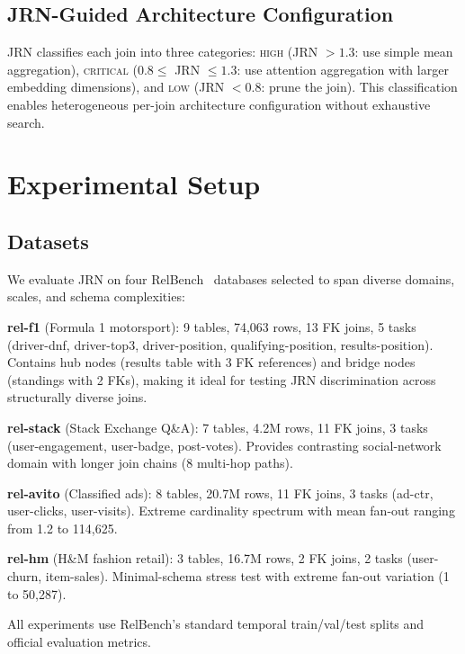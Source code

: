 \documentclass[11pt,letterpaper]{article}
\begin{document}
\subsection{JRN-Guided Architecture Configuration}

JRN classifies each join into three categories: \textsc{high} (JRN $> 1.3$: use simple mean aggregation), \textsc{critical} ($0.8 \leq$ JRN $\leq 1.3$: use attention aggregation with larger embedding dimensions), and \textsc{low} (JRN $< 0.8$: prune the join). This classification enables heterogeneous per-join architecture configuration without exhaustive search.

\section{Experimental Setup}
\label{sec:setup}

\subsection{Datasets}

We evaluate JRN on four RelBench~\citep{Robinson2024} databases selected to span diverse domains, scales, and schema complexities:

\textbf{rel-f1} (Formula 1 motorsport): 9 tables, 74,063 rows, 13 FK joins, 5 tasks (driver-dnf, driver-top3, driver-position, qualifying-position, results-position). Contains hub nodes (results table with 3 FK references) and bridge nodes (standings with 2 FKs), making it ideal for testing JRN discrimination across structurally diverse joins.

\textbf{rel-stack} (Stack Exchange Q\&A): 7 tables, 4.2M rows, 11 FK joins, 3 tasks (user-engagement, user-badge, post-votes). Provides contrasting social-network domain with longer join chains (8 multi-hop paths).

\textbf{rel-avito} (Classified ads): 8 tables, 20.7M rows, 11 FK joins, 3 tasks (ad-ctr, user-clicks, user-visits). Extreme cardinality spectrum with mean fan-out ranging from 1.2 to 114,625.

\textbf{rel-hm} (H\&M fashion retail): 3 tables, 16.7M rows, 2 FK joins, 2 tasks (user-churn, item-sales). Minimal-schema stress test with extreme fan-out variation (1 to 50,287).

All experiments use RelBench's standard temporal train/val/test splits and official evaluation metrics.
\end{document}

